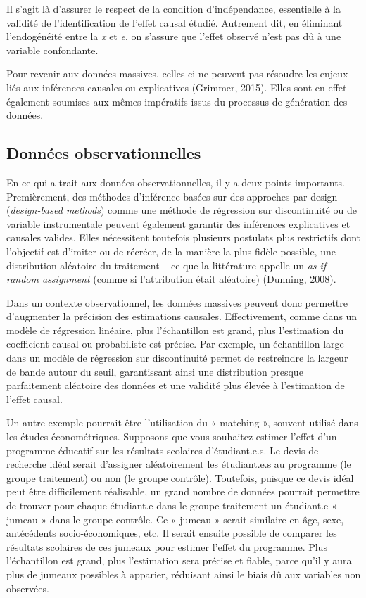 \documentclass[
  letterpaper,
  DIV=11,
  numbers=noendperiod]{scrreprt}
\begin{document}
Il s'agit là d'assurer le respect de la condition d'indépendance,
essentielle à la validité de l'identification de l'effet causal étudié.
Autrement dit, en éliminant l'endogénéité entre la \emph{x} et \emph{e},
on s'assure que l'effet observé n'est pas dû à une variable confondante.

Pour revenir aux données massives, celles-ci ne peuvent pas résoudre les
enjeux liés aux inférences causales ou explicatives (Grimmer, 2015).
Elles sont en effet également soumises aux mêmes impératifs issus du
processus de génération des données.

\hypertarget{donnuxe9es-observationnelles}{%
\subsection*{Données
observationnelles}\label{donnuxe9es-observationnelles}}

En ce qui a trait aux données observationnelles, il y a deux points
importants. Premièrement, des méthodes d'inférence basées sur des
approches par design (\emph{design-based methods}) comme une méthode de
régression sur discontinuité ou de variable instrumentale peuvent
également garantir des inférences explicatives et causales valides.
Elles nécessitent toutefois plusieurs postulats plus restrictifs dont
l'objectif est d'imiter ou de récréer, de la manière la plus fidèle
possible, une distribution aléatoire du traitement -- ce que la
littérature appelle un \emph{as-if random assignment} (comme si
l'attribution était aléatoire) (Dunning, 2008).

Dans un contexte observationnel, les données massives peuvent donc
permettre d'augmenter la précision des estimations causales.
Effectivement, comme dans un modèle de régression linéaire, plus
l'échantillon est grand, plus l'estimation du coefficient causal ou
probabiliste est précise. Par exemple, un échantillon large dans un
modèle de régression sur discontinuité permet de restreindre la largeur
de bande autour du seuil, garantissant ainsi une distribution presque
parfaitement aléatoire des données et une validité plus élevée à
l'estimation de l'effet causal.

Un autre exemple pourrait être l'utilisation du « matching », souvent
utilisé dans les études économétriques. Supposons que vous souhaitez
estimer l'effet d'un programme éducatif sur les résultats scolaires
d'étudiant.e.s. Le devis de recherche idéal serait d'assigner
aléatoirement les étudiant.e.s au programme (le groupe traitement) ou
non (le groupe contrôle). Toutefois, puisque ce devis idéal peut être
difficilement réalisable, un grand nombre de données pourrait permettre
de trouver pour chaque étudiant.e dans le groupe traitement un
étudiant.e « jumeau » dans le groupe contrôle. Ce « jumeau » serait
similaire en âge, sexe, antécédents socio-économiques, etc. Il serait
ensuite possible de comparer les résultats scolaires de ces jumeaux pour
estimer l'effet du programme. Plus l'échantillon est grand, plus
l'estimation sera précise et fiable, parce qu'il y aura plus de jumeaux
possibles à apparier, réduisant ainsi le biais dû aux variables non
observées.
\end{document}
